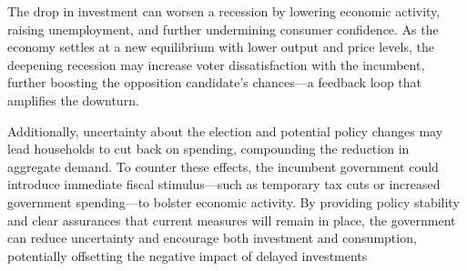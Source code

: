 The drop in investment can worsen a recession by lowering economic activity, raising unemployment, and further undermining consumer confidence. As the economy settles at a new equilibrium with lower output and price levels, the deepening recession may increase voter dissatisfaction with the incumbent, further boosting the opposition candidate's chances—a feedback loop that amplifies the downturn.

Additionally, uncertainty about the election and potential policy changes may lead households to cut back on spending, compounding the reduction in aggregate demand. To counter these effects, the incumbent government could introduce immediate fiscal stimulus—such as temporary tax cuts or increased government spending—to bolster economic activity. By providing policy stability and clear assurances that current measures will remain in place, the government can reduce uncertainty and encourage both investment and consumption, potentially offsetting the negative impact of delayed investments
\begin{center}
\end{center}
